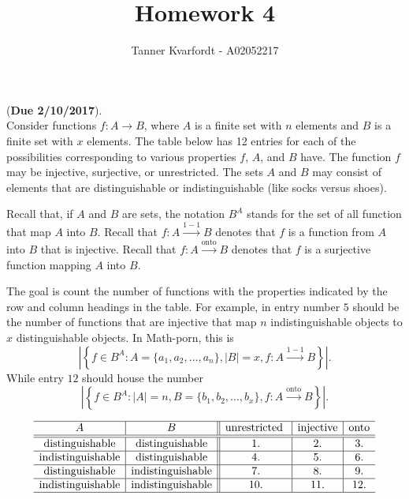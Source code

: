 \documentclass[12pt]{article}
\begin{document}
 
 
\title{Homework 4}
\author{Tanner Kvarfordt - A02052217}
\maketitle

 ({\bf Due 2/10/2017}).\\ %

\noindent  Consider functions $f:A \to B$, where $A$ is a finite set with $n$ elements and $B$ is a finite set with $x$ elements.
The table below has 12 entries for each of the possibilities corresponding to various properties $f$, $A$, and $B$ have.
The function $f$ may be injective, surjective, or unrestricted.  The sets $A$ and $B$ may consist of elements that are distinguishable or indistinguishable
(like socks versus shoes).

Recall that, if $A$ and $B$ are sets, the notation $B^A$ stands for the set of all function that map $A$ into $B$.
Recall that $f:A \stackrel{1-1}{\longrightarrow} B$ denotes that $f$ is a function from $A$ into $B$ that is injective.
Recall that $f:A \stackrel{\mbox{onto}}{\longrightarrow} B$ denotes that $f$ is a surjective function mapping $A$ into $B$.

The goal is count the number of functions with the properties indicated by the row and column headings in the table.
For example, in entry number $5$ should be the number of functions that are injective that map $n$ indistinguishable objects to $x$ distinguishable objects.
In Math-porn, this is
$$\left|\left\{f \in B^A : A=\{a_1,a_2, \dots, a_n\}, |B| = x, f:A \stackrel{1-1}{\longrightarrow} B  \right\} \right|.$$
While entry $12$ should house the number
$$\left|\left\{f \in B^A : |A|=n, B =\{b_1,b_2, \dots, b_x\}, f:A \stackrel{\mbox{onto}}{\longrightarrow} B  \right\} \right|.$$

$$\begin{array}{c|c||c|c|c}
\hline A & B & \mbox{unrestricted }& \mbox{injective}& \mbox{onto} \\ \hline \hline
\mbox{distinguishable} & \mbox{distinguishable} & 1. & 2. & 3. \\ \hline
\mbox{indistinguishable}& \mbox{distinguishable}&4.&5.&6. \\ \hline
\mbox{distinguishable} & \mbox{indistinguishable}& 7. & 8. & 9. \\ \hline
\mbox{indistinguishable}&\mbox{indistinguishable}& 10. &11.&12. \\ \hline \end{array}$$\\
\end{document}
